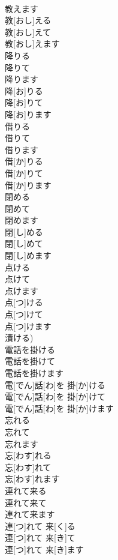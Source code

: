 \documentclass[8pt]{extreport}
\begin{document}
\begin{CJK}{UTF8}{min}
\\	教えます	
\\	教[おし]える 
\\	教[おし]えて 
\\	教[おし]えます	
\\	降りる 
\\	降りて 
\\	降ります	
\\	降[お]りる 
\\	降[お]りて 
\\	降[お]ります	
\\	借りる 
\\	借りて 
\\	借ります	
\\	借[か]りる 
\\	借[か]りて 
\\	借[か]ります	
\\	閉める 
\\	閉めて 
\\	閉めます	
\\	閉[し]める 
\\	閉[し]めて 
\\	閉[し]めます	
\\	点ける 
\\	点けて 
\\	点けます	
\\	点[つ]ける 
\\	点[つ]けて 
\\	点[つ]けます 
\\	漬ける)	
\\	電話を掛ける 
\\	電話を掛けて 
\\	電話を掛けます	
\\	電[でん]話[わ]を 掛[か]ける 
\\	電[でん]話[わ]を 掛[か]けて 
\\	電[でん]話[わ]を 掛[か]けます	
\\	忘れる 
\\	忘れて 
\\	忘れます	
\\	忘[わす]れる 
\\	忘[わす]れて 
\\	忘[わす]れます	
\\	連れて来る 
\\	連れて来て 
\\	連れて来ます	
\\	連[つ]れて 来[く]る 
\\	連[つ]れて 来[き]て 
\\	連[つ]れて 来[き]ます	

\end{CJK}
\end{document}
